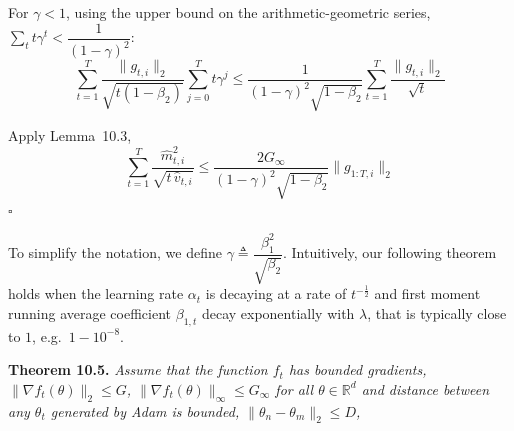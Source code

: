 \documentclass[11pt]{article}
\begin{document}
\noindent
For $\gamma < 1$, using the upper bound on the
arithmetic-geometric series,
$\sum_t t\gamma^{t} < \dfrac{1}{(1 - \gamma)^2}$:
\[
\sum_{t=1}^{T} \frac{\|g_{t,i}\|_2}{\sqrt{t(1 - \beta_2)}}
  \sum_{j=0}^{T} t\gamma^{j}
 \leq \frac{1}{(1 - \gamma)^2 \sqrt{1 - \beta_2}}
      \sum_{t=1}^{T} \frac{\|g_{t,i}\|_2}{\sqrt{t}}
\]

\noindent
Apply Lemma~10.3,
\[
\sum_{t=1}^{T} \frac{\widehat{m}_{t,i}^2}{\sqrt{t\,\widehat{v}_{t,i}}}
 \leq \frac{2 G_\infty}{(1 - \gamma)^2 \sqrt{1 - \beta_2}}
      \|g_{1:T,i}\|_2
\]
\hfill$\square$

\vspace{0.5em}

\noindent
To simplify the notation, we define
$\gamma \triangleq \dfrac{\beta_1^2}{\sqrt{\beta_2}}$.
Intuitively, our following theorem holds when the learning rate
$\alpha_t$ is decaying at a rate of $t^{-\frac{1}{2}}$ and first
moment running average coefficient $\beta_{1,t}$ decay
exponentially with $\lambda$, that is typically close to $1$,
e.g.\ $1 - 10^{-8}$.

\vspace{0.5em}

\noindent\textbf{Theorem 10.5.} \emph{Assume that the function
$f_t$ has bounded gradients,
$\|\nabla f_t(\theta)\|_2 \leq G$,
$\|\nabla f_t(\theta)\|_\infty \leq G_\infty$ for all
$\theta \in \mathbb{R}^d$ and distance between any $\theta_t$
generated by Adam is bounded,
$\|\theta_n - \theta_m\|_2 \leq D$,}

\end{document}
